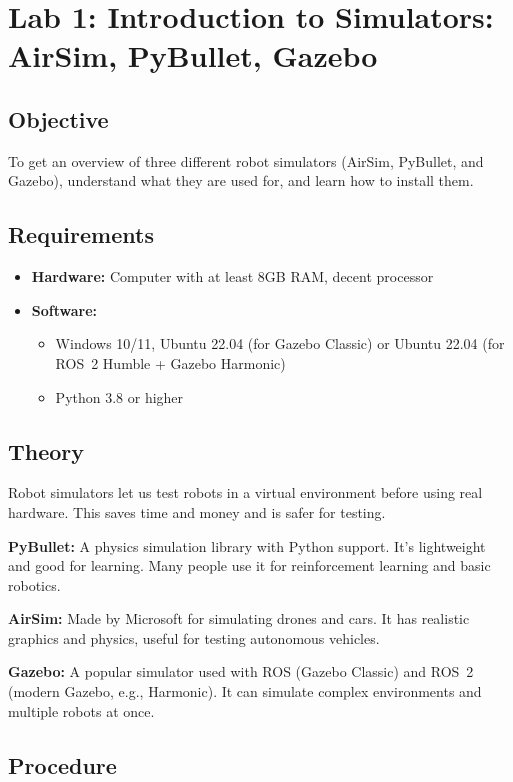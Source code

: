 \section{Lab 1: Introduction to Simulators: AirSim, PyBullet, Gazebo}

\subsection{Objective}
To get an overview of three different robot simulators (AirSim, PyBullet, and Gazebo), understand what they are used for, and learn how to install them.

\subsection{Requirements}
\begin{itemize}
	\item \textbf{Hardware:} Computer with at least 8GB RAM, decent processor
	\item \textbf{Software:} 
	\begin{itemize}
		\item Windows 10/11, Ubuntu 22.04 (for Gazebo Classic) or Ubuntu 22.04 (for ROS~2 Humble + Gazebo Harmonic)
		\item Python 3.8 or higher
	\end{itemize}
\end{itemize}

\subsection{Theory}

Robot simulators let us test robots in a virtual environment before using real hardware. This saves time and money and is safer for testing.

\textbf{PyBullet:} A physics simulation library with Python support. It's lightweight and good for learning. Many people use it for reinforcement learning and basic robotics.

\textbf{AirSim:} Made by Microsoft for simulating drones and cars. It has realistic graphics and physics, useful for testing autonomous vehicles.

\textbf{Gazebo:} A popular simulator used with ROS (Gazebo Classic) and ROS~2 (modern Gazebo, e.g., Harmonic). It can simulate complex environments and multiple robots at once.

\subsection{Procedure}

